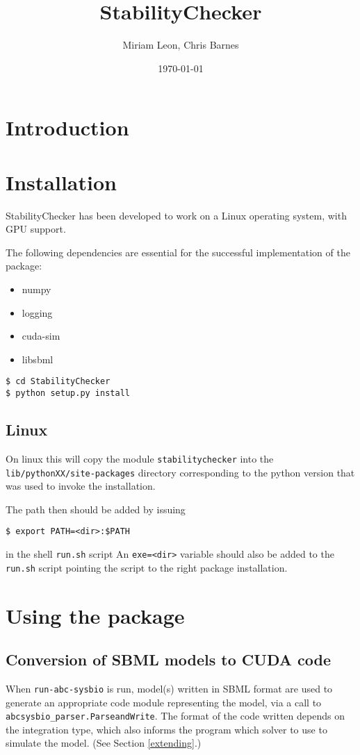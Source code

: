 \documentclass[a4paper]{report}
\title{StabilityChecker}
\author{Miriam Leon, Chris Barnes}
\date{\today}
\begin{document}
\maketitle

\tableofcontents

\chapter{Introduction}
\chapter{Installation}
	StabilityChecker has been developed to work on a Linux operating system, with GPU support.
	
The following dependencies are essential for the successful implementation of the package:
\begin{itemize}
	\item numpy
	\item logging
	\item cuda-sim
	\item libsbml
\end{itemize}


\begin{verbatim}
$ cd StabilityChecker
$ python setup.py install
\end{verbatim}

\section{Linux}
On linux this will copy the module \verb$stabilitychecker$ into the \verb$lib/pythonXX/site-packages$ directory corresponding to the python version that was used to invoke the installation.

The path then should be added  by issuing
\begin{verbatim}
$ export PATH=<dir>:$PATH 
\end{verbatim}
in the shell \verb$run.sh$ script
An \verb$exe=<dir>$ variable should also be added to the \verb$run.sh$ script pointing the script to the right package installation.
\chapter{Using the package}
\label{Using the package}

\section{Conversion of SBML models to CUDA code}
When \verb$run-abc-sysbio$ is run, model(s) written in SBML format are used to generate an appropriate code module representing the model, via a call to \verb$abcsysbio_parser.ParseandWrite$. The format of the code written depends on the integration type, which also informs the program which solver to use to simulate the model. (See Section \ref{extending}.)
\end{document}
